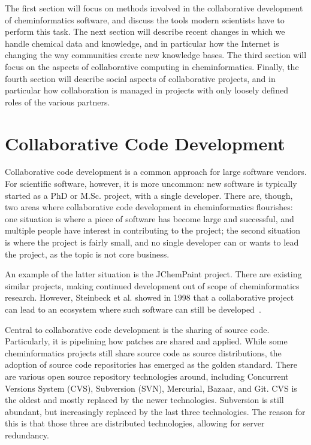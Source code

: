 \documentclass[11pt]{book}
\begin{document}
The first section will focus on methods involved in the collaborative
development of cheminformatics software, and discuss the tools modern
scientists have to perform this task. The next section will describe
recent changes in which we handle chemical data and knowledge, and in
particular how the Internet is changing the way communities create new
knowledge bases. The third section will focus on the aspects of
collaborative computing in cheminformatics. Finally, the fourth
section will describe social aspects of collaborative projects, and in
particular how collaboration is managed in projects with only loosely
defined roles of the various partners.

\section{Collaborative Code Development}

Collaborative code development is a common approach for large software vendors.
For scientific software, however, it is more uncommon: new software is typically
started as a PhD or M.Sc. project, with a single developer. There are, though,
two areas where collaborative code development in cheminformatics flourishes:
one situation is where a piece of software has become large and successful,
and multiple people have interest in contributing to the project; the second
situation is where the project is fairly small, and no single developer can
or wants to lead the project, as the topic is not core business.

An example of the latter situation is the JChemPaint project. There are existing
similar projects, making continued development out of scope of cheminformatics
research. However, Steinbeck et al. showed in 1998 that a collaborative project
can lead to an ecosystem where such software can still be
developed~\cite{Krause2000}.

Central to collaborative code development is the sharing of source code. Particularly,
it is pipelining how patches are shared and applied. While some cheminformatics
projects still share source code as source distributions, the adoption of
source code repositories has emerged as the golden standard. There are various 
open source repository technologies around, including Concurrent Versions System (CVS),
Subversion (SVN), Mercurial, Bazaar, and Git. CVS is the oldest and mostly replaced
by the newer technologies. Subversion is still abundant, but increasingly
replaced by the last three technologies. The reason for this is that
those three are distributed technologies, allowing for server redundancy.
\end{document}
